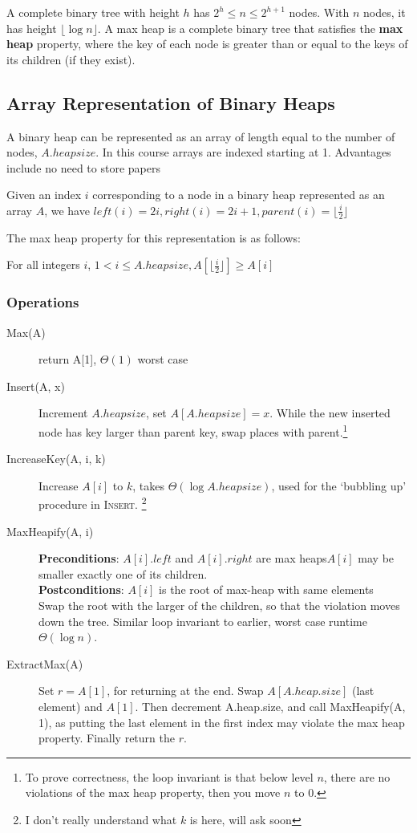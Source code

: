 A complete binary tree with height $h$ has $2^h \leq n \leq 2^{h + 1}$ nodes. With $n$ nodes, it has height $\lfloor \log n \rfloor$. A max heap is a complete binary tree that satisfies the \textbf{max heap} property, where the key of each node is greater than or equal to the keys of its children (if they exist).

\subsection{Array Representation of Binary Heaps}
A binary heap can be represented as an array of length equal to the number of nodes, $A.heapsize$. In this course arrays are indexed starting at 1. Advantages include no need to store papers 
\begin{simplethm}
    Given an index $i$ corresponding to a node in a binary heap represented as an array $A$, we have $left(i) = 2i, right(i) = 2i+1, parent(i) = \lfloor \frac{i}{2} \rfloor $
\end{simplethm}
\noindent The max heap property for this representation is as follows:
\begin{center}
For all integers $i$, $1 < i \leq A.heapsize, A[\lfloor \frac{i}{2} \rfloor ] \geq A[i]$
\end{center}

\subsubsection{Operations}
\begin{description}
    \item[Max(A)] return A[1], $\Theta(1)$ worst case 
    \item[Insert(A, x)] Increment $A.heapsize$, set $A[A.heapsize] = x$. While the new inserted node has key larger than parent key, swap places with parent.\footnote{To prove correctness, the loop invariant is that below level $n$, there are no violations of the max heap property, then you move $n$ to $0$.}
    \item[IncreaseKey(A, i, k)] Increase $A[i]$ to $k$, takes $\Theta(\log A.heapsize)$, used for the `bubbling up' procedure in \textsc{Insert}. \footnote{I don't really understand what $k$ is here, will ask soon }
    \item[MaxHeapify(A, i)] \leavevmode\newline %
    \textbf{Preconditions}: $A[i].left$ and $A[i].right$ are max heaps$A[i]$ may be smaller exactly one of its children. \\
    \textbf{Postconditions}: $A[i]$ is the root of max-heap with same elements \\
    Swap the root with the larger of the children, so that the violation moves down the tree. Similar loop invariant to earlier, worst case runtime $\Theta(\log n)$.
    \item[ExtractMax(A)] Set $r = A[1]$, for returning at the end. Swap $A[A.heap.size]$ (last element) and $A[1]$. Then decrement A.heap.size, and call MaxHeapify(A, 1), as putting the last element in the first index may violate the max heap property. Finally return the $r$.
\end{description}

